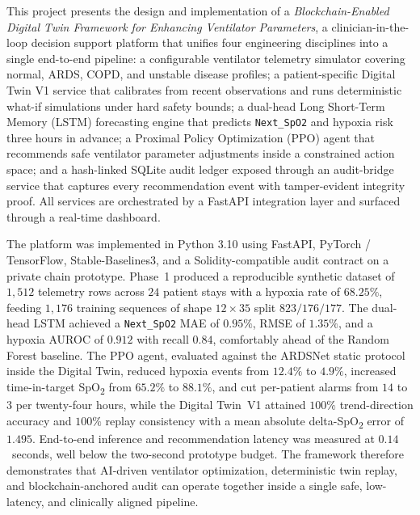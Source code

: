 \documentclass[12pt,a4paper,oneside]{report}
\begin{document}
This project presents the design and implementation of a \textit{Blockchain-Enabled Digital Twin Framework for Enhancing Ventilator Parameters}, a clinician-in-the-loop decision support platform that unifies four engineering disciplines into a single end-to-end pipeline: a configurable ventilator telemetry simulator covering normal, ARDS, COPD, and unstable disease profiles; a patient-specific Digital Twin V1 service that calibrates from recent observations and runs deterministic what-if simulations under hard safety bounds; a dual-head Long Short-Term Memory (LSTM) forecasting engine that predicts \texttt{Next\_SpO2} and hypoxia risk three hours in advance; a Proximal Policy Optimization (PPO) agent that recommends safe ventilator parameter adjustments inside a constrained action space; and a hash-linked SQLite audit ledger exposed through an audit-bridge service that captures every recommendation event with tamper-evident integrity proof. All services are orchestrated by a FastAPI integration layer and surfaced through a real-time dashboard.

The platform was implemented in Python 3.10 using FastAPI, PyTorch / TensorFlow, Stable-Baselines3, and a Solidity-compatible audit contract on a private chain prototype. Phase~1 produced a reproducible synthetic dataset of $1{,}512$ telemetry rows across $24$ patient stays with a hypoxia rate of $68.25\%$, feeding $1{,}176$ training sequences of shape $12{\times}35$ split $823/176/177$. The dual-head LSTM achieved a \texttt{Next\_SpO2} MAE of $0.95\%$, RMSE of $1.35\%$, and a hypoxia AUROC of $0.912$ with recall $0.84$, comfortably ahead of the Random Forest baseline. The PPO agent, evaluated against the ARDSNet static protocol inside the Digital Twin, reduced hypoxia events from $12.4\%$ to $4.9\%$, increased time-in-target SpO\textsubscript{2} from $65.2\%$ to $88.1\%$, and cut per-patient alarms from $14$ to $3$ per twenty-four hours, while the Digital Twin~V1 attained $100\%$ trend-direction accuracy and $100\%$ replay consistency with a mean absolute delta-SpO\textsubscript{2} error of $1.495$. End-to-end inference and recommendation latency was measured at $0.14$~seconds, well below the two-second prototype budget. The framework therefore demonstrates that AI-driven ventilator optimization, deterministic twin replay, and blockchain-anchored audit can operate together inside a single safe, low-latency, and clinically aligned pipeline.
\newpage

\renewcommand{\contentsname}{\centering CONTENTS}
\tableofcontents
\newpage
\end{document}
